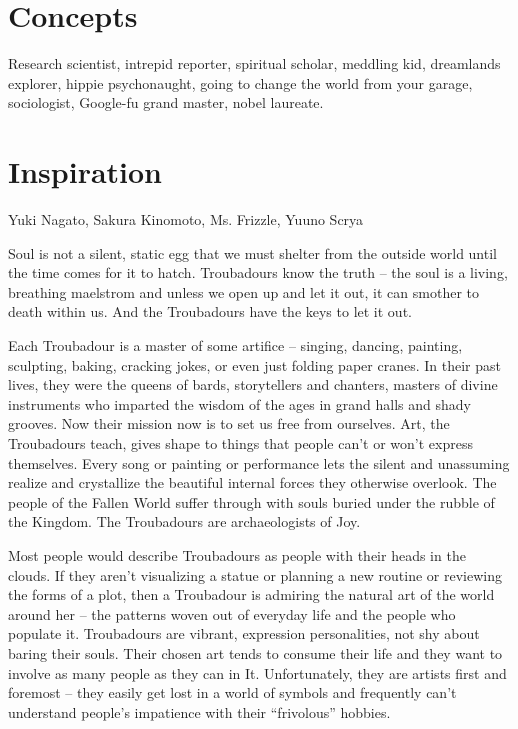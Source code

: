 \section*{Concepts}
Research scientist, intrepid reporter, spiritual scholar, meddling kid, dreamlands explorer, hippie psychonaught, going to change the world from your garage, sociologist, Google-fu grand master, nobel laureate.

\section*{Inspiration}
Yuki Nagato, Sakura Kinomoto, Ms. Frizzle, Yuuno Scrya 

\newpage{}
Soul is not a silent, static egg that we must shelter from the outside world until the time comes for it to hatch. Troubadours know the truth – the soul is a living, breathing maelstrom and unless we open up and let it out, it can smother to death within us. And the Troubadours have the keys to let it out.

Each Troubadour is a master of some artifice – singing, dancing, painting, sculpting, baking, cracking jokes, or even just folding paper cranes. In their past lives, they were the queens of bards, storytellers and chanters, masters of divine instruments who imparted the wisdom of the ages in grand halls and shady grooves. Now their mission now is to set us free from ourselves. Art, the Troubadours teach, gives shape to things that people can't or won't express themselves. Every song or painting or performance lets the silent and unassuming realize and crystallize the beautiful internal forces they otherwise overlook. The people of the Fallen World suffer through with souls buried under the rubble of the Kingdom. The Troubadours are archaeologists of Joy.

Most people would describe Troubadours as people with their heads in the clouds. If they aren't visualizing a statue or planning a new routine or reviewing the forms of a plot, then a Troubadour is admiring the natural art of the world around her – the patterns woven out of everyday life and the people who populate it. Troubadours are vibrant, expression personalities, not shy about baring their souls. Their chosen art tends to consume their life and they want to involve as many people as they can in It. Unfortunately, they are artists first and foremost – they easily get lost in a world of symbols and frequently can't understand people's impatience with their “frivolous” hobbies. 

